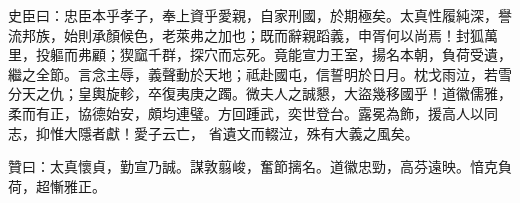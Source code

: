 \begin{pinyinscope}
 史臣曰：忠臣本乎孝子，奉上資乎愛親，自家刑國，於期極矣。太真性履純深，譽流邦族，始則承顏候色，老萊弗之加也；既而辭親蹈義，申胥何以尚焉！封狐萬里，投軀而弗顧；猰窳千群，探穴而忘死。竟能宣力王室，揚名本朝，負荷受遺，繼之全節。言念主辱，義聲動於天地；祗赴國屯，信誓明於日月。枕戈雨泣，若雪分天之仇；皇輿旋軫，卒復夷庚之躅。微夫人之誠懇，大盜幾移國乎！道徽儒雅，柔而有正，協德始安，頗均連璧。方回踵武，奕世登台。露冕為飾，援高人以同志，抑惟大隱者獻！愛子云亡，
 省遺文而輟泣，殊有大義之風矣。



 贊曰：太真懷貞，勤宣乃誠。謀敦翦峻，奮節摛名。道徽忠勁，高芬遠映。愔克負荷，超慚雅正。



\end{pinyinscope}